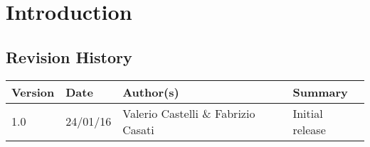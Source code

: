 \chapter{Introduction}
\section{Revision History}
\begin{center}
\begin{longtable}{|l|l|l|l|}
\hline
Version &
Date &
Author(s) &
Summary \\
\hline
1.0 &
24/01/16 &
Valerio Castelli \& Fabrizio Casati &
Initial release \\
\hline
\end{longtable}
\end{center}